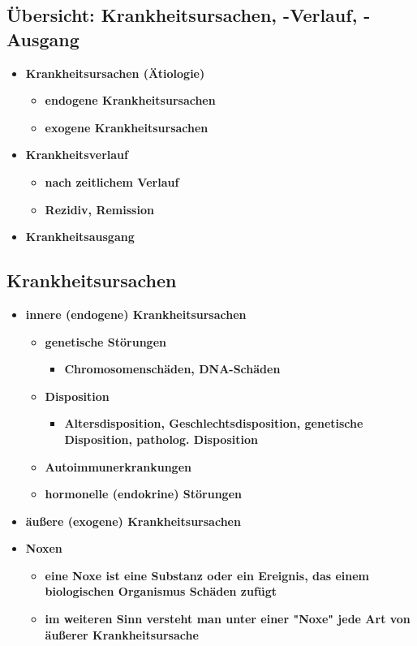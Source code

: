 \subsection{Übersicht: Krankheitsursachen, -Verlauf, -Ausgang}
	\begin{itemize}
		\item \textbf{Krankheitsursachen (Ätiologie)}
			\begin{itemize}
				\item \textbf{endogene Krankheitsursachen}
				\item \textbf{exogene Krankheitsursachen}
			\end{itemize}
		\item \textbf{Krankheitsverlauf}
			\begin{itemize}
				\item \textbf{nach zeitlichem Verlauf}
				\item \textbf{Rezidiv, Remission}
			\end{itemize}
		\item \textbf{Krankheitsausgang}
	\end{itemize}

\subsection{Krankheitsursachen}
	\begin{itemize}
		\item \textbf{innere (endogene) Krankheitsursachen}
			\begin{itemize}
				\item \textbf{genetische Störungen}
					\begin{itemize}
						\item \textbf{Chromosomenschäden, DNA-Schäden}
					\end{itemize}
				\item \textbf{Disposition}
					\begin{itemize}
						\item \textbf{Altersdisposition, Geschlechtsdisposition, genetische Disposition, patholog. Disposition}
					\end{itemize}
				\item \textbf{Autoimmunerkrankungen}
				\item \textbf{hormonelle (endokrine) Störungen}
			\end{itemize}
		\item \textbf{äußere (exogene) Krankheitsursachen}
		\item \textbf{Noxen}
			\begin{itemize}
				\item \textbf{eine Noxe ist eine Substanz oder ein Ereignis, das einem biologischen Organismus Schäden zufügt}
				\item \textbf{im weiteren Sinn versteht man unter einer "Noxe" jede Art von äußerer Krankheitsursache}
			\end{itemize}
	\end{itemize}
\pagebreak
